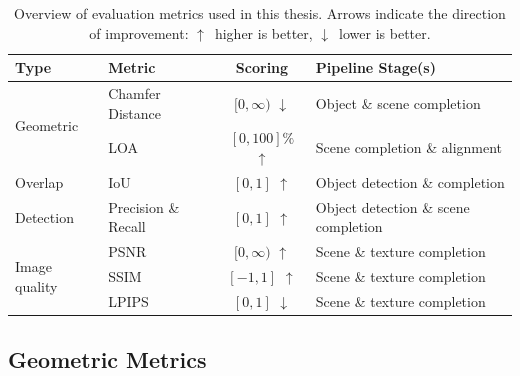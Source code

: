 \begin{table}[hb]
    \centering
    \caption[Evaluation metrics overview]{Overview of evaluation metrics used in this thesis. Arrows indicate the direction of improvement: $\uparrow$~higher is better, $\downarrow$~lower is better.}
    \label{tab:metrics_overview}
    \begin{tabularx}{\textwidth}{l l c X}
        \toprule
        \textbf{Type} & \textbf{Metric} & \textbf{Scoring} & \textbf{Pipeline Stage(s)} \\
        \midrule
        \multirow{2}{*}{Geometric}
            & Chamfer Distance    & $[0, \infty)$ $\downarrow$ & Object \& scene \newline completion \\
            & \gls{LOA}           & $[0, 100]\%$ $\uparrow$    & Scene completion \newline \& alignment \\
        \midrule
        Overlap
            & \gls{IoU}           & $[0, 1]$ $\uparrow$        & Object detection \newline \& completion \\
        \midrule
        Detection
            & Precision \& Recall & $[0, 1]$ $\uparrow$        & Object detection \newline \& scene completion \\
        \midrule
        \multirow{3}{*}{Image quality}
            & \gls{PSNR}          & $[0, \infty)$ $\uparrow$   & Scene \& texture \newline completion \\
            & \gls{SSIM}          & $[-1, 1]$ $\uparrow$       & Scene \& texture \newline completion \\
            & \gls{LPIPS}         & $[0, 1]$ $\downarrow$      & Scene \& texture \newline completion \\
        \bottomrule
    \end{tabularx}
\end{table}


\subsection{Geometric Metrics}
\label{sec:bg_metrics_geometric}

